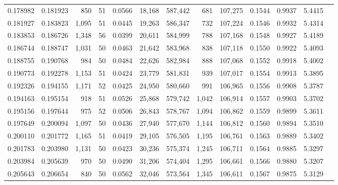 \begin{tabular}{rrrrrrrrrrrrr}
0.178982 & 0.181923 &   850 &  51 &                                     0.0566 &  18,168 & 587,442 &     681 & 107,275 & 0.1544 & 0.9937 & 5.4415 \\
0.181927 & 0.183823 & 1,095 &  51 &                                     0.0445 &  19,263 & 586,347 &     732 & 107,224 & 0.1546 & 0.9932 & 5.4314 \\
0.183853 & 0.186726 & 1,348 &  56 &                                     0.0399 &  20,611 & 584,999 &     788 & 107,168 & 0.1548 & 0.9927 & 5.4189 \\
0.186744 & 0.188747 & 1,031 &  50 &                                     0.0463 &  21,642 & 583,968 &     838 & 107,118 & 0.1550 & 0.9922 & 5.4093 \\
0.188755 & 0.190768 &   984 &  50 &                                     0.0484 &  22,626 & 582,984 &     888 & 107,068 & 0.1552 & 0.9918 & 5.4002 \\
0.190773 & 0.192278 & 1,153 &  51 &                                     0.0424 &  23,779 & 581,831 &     939 & 107,017 & 0.1554 & 0.9913 & 5.3895 \\
0.192326 & 0.194155 & 1,171 &  52 &                                     0.0425 &  24,950 & 580,660 &     991 & 106,965 & 0.1556 & 0.9908 & 5.3787 \\
0.194163 & 0.195154 &   918 &  51 &                                     0.0526 &  25,868 & 579,742 &   1,042 & 106,914 & 0.1557 & 0.9903 & 5.3702 \\
0.195156 & 0.197644 &   975 &  52 &                                     0.0506 &  26,843 & 578,767 &   1,094 & 106,862 & 0.1559 & 0.9899 & 5.3611 \\
0.197649 & 0.200094 & 1,097 &  50 &                                     0.0436 &  27,940 & 577,670 &   1,144 & 106,812 & 0.1560 & 0.9894 & 5.3510 \\
0.200110 & 0.201772 & 1,165 &  51 &                                     0.0419 &  29,105 & 576,505 &   1,195 & 106,761 & 0.1563 & 0.9889 & 5.3402 \\
0.201783 & 0.203980 & 1,131 &  50 &                                     0.0423 &  30,236 & 575,374 &   1,245 & 106,711 & 0.1564 & 0.9885 & 5.3297 \\
0.203984 & 0.205639 &   970 &  50 &                                     0.0490 &  31,206 & 574,404 &   1,295 & 106,661 & 0.1566 & 0.9880 & 5.3207 \\
0.205643 & 0.206654 &   840 &  50 &                                     0.0562 &  32,046 & 573,564 &   1,345 & 106,611 & 0.1567 & 0.9875 & 5.3129 \\

\end{tabular}
